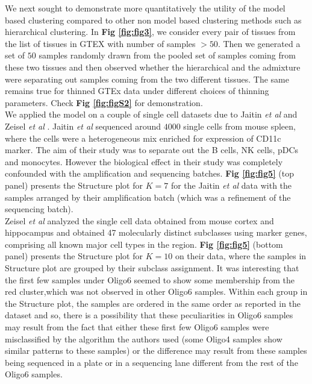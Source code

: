 We next sought to demonstrate more quantitatively the utility of the model based clustering compared to other non model based clustering methods such as hierarchical clustering. In \textbf{Fig \ref{fig:fig3}}, we consider every pair of tissues from the list of tissues in GTEX with number of samples $> 50$. Then we generated a set of $50$ samples randomly drawn from the pooled set of samples coming from these two tissues and then observed whether the hierarchical and the admixture were separating out samples coming from the two different tissues. The same remains true for  thinned GTEx data under different choices of thinning parameters. Check  \textbf{Fig \ref{fig:figS2}} for demonstration.  \\[1 pt]

We applied the model on a couple of single cell datasets due to Jaitin \textit{et al} \cite{Jaitin2014} and Zeisel \textit{et al} \cite{Zeisel2015}.  Jaitin \textit{et al} sequenced around $4000$ single cells from mouse spleen, where the cells were a heterogeneous mix enriched for expression of CD11c marker.  The aim of their study was to separate out the B cells, NK cells, pDCs and monocytes.  However the biological effect in their study was completely confounded with the amplification and sequencing batches.  \textbf{Fig \ref{fig:fig5}} (top panel) presents the Structure plot  for $K=7$ for the Jaitin \textit{et al} data with the samples arranged by their amplification batch (which was a refinement of the sequencing batch). \\[1 pt]

Zeisel \textit{et al} analyzed the single cell data obtained from mouse cortex and hippocampus and obtained 47 molecularly distinct subclasses using marker genes, comprising all known major cell types in the region. \textbf{Fig \ref{fig:fig5}} (bottom panel) presents the Structure plot for  $K=10$ on their data, where the samples in Structure plot are grouped by their subclass assignment. It was interesting that the first few samples under Oligo6 seemed to show some membership from the red cluster,which was not observed in other Oligo6 samples. Within each group in the Structure plot, the samples are ordered in the same order as reported in the dataset and so, there is a possibility that these peculiarities in Oligo6 samples may result from the fact that either these first few Oligo6 samples were misclassified by the algorithm the authors used (some Oligo4 samples show similar patterns to these samples) or the difference may result from these samples being sequenced in a plate or in a sequencing lane different from the rest of the Oligo6 samples. \\[1 pt]


